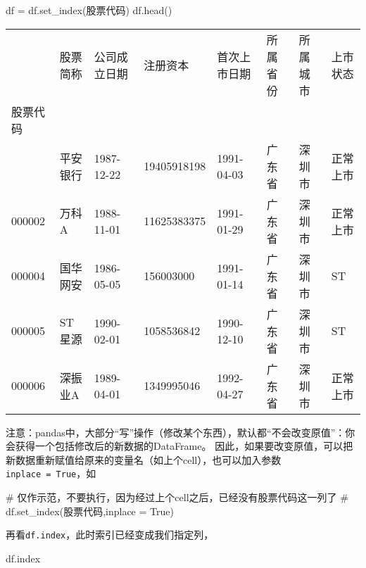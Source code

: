 \documentclass[
  letterpaper,
  DIV=11,
  numbers=noendperiod]{scrreprt}
\newenvironment{Shaded}{\begin{snugshade}}{\end{snugshade}}
\newcommand{\CommentTok}[1]{\textcolor[rgb]{0.37,0.37,0.37}{#1}}
\newcommand{\NormalTok}[1]{\textcolor[rgb]{0.00,0.23,0.31}{#1}}
\newcommand{\OperatorTok}[1]{\textcolor[rgb]{0.37,0.37,0.37}{#1}}
\newcommand{\StringTok}[1]{\textcolor[rgb]{0.13,0.47,0.30}{#1}}
\begin{document}
\begin{Shaded}
\begin{Highlighting}[]
\NormalTok{df }\OperatorTok{=}\NormalTok{ df.set\_index(}\StringTok{\textquotesingle{}股票代码\textquotesingle{}}\NormalTok{) }
\NormalTok{df.head()}
\end{Highlighting}
\end{Shaded}

\begin{longtable}[]{@{}llllllll@{}}
\toprule\noalign{}
& 股票简称 & 公司成立日期 & 注册资本 & 首次上市日期 & 所属省份 &
所属城市 & 上市状态 \\
股票代码 & & & & & & & \\
\midrule\noalign{}
\endhead
\bottomrule\noalign{}
\endlastfoot
000001 & 平安银行 & 1987-12-22 & 19405918198 & 1991-04-03 & 广东省 &
深圳市 & 正常上市 \\
000002 & 万科A & 1988-11-01 & 11625383375 & 1991-01-29 & 广东省 & 深圳市
& 正常上市 \\
000004 & 国华网安 & 1986-05-05 & 156003000 & 1991-01-14 & 广东省 &
深圳市 & ST \\
000005 & ST 星源 & 1990-02-01 & 1058536842 & 1990-12-10 & 广东省 &
深圳市 & ST \\
000006 & 深振业A & 1989-04-01 & 1349995046 & 1992-04-27 & 广东省 &
深圳市 & 正常上市 \\
\end{longtable}

注意：pandas中，大部分``写''操作（修改某个东西），默认都``不会改变原值''：你会获得一个包括修改后的新数据的DataFrame。
因此，如果要改变原值，可以把新数据重新赋值给原来的变量名（如上个cell），也可以加入参数\texttt{inplace\ =\ True}，如

\begin{Shaded}
\begin{Highlighting}[]
\CommentTok{\# 仅作示范，不要执行，因为经过上个cell之后，已经没有\textasciigrave{}股票代码\textasciigrave{}这一列了}
\CommentTok{\# df.set\_index(\textquotesingle{}股票代码\textquotesingle{},inplace = True)}
\end{Highlighting}
\end{Shaded}

再看\texttt{df.index}，此时索引已经变成我们指定列，

\begin{Shaded}
\begin{Highlighting}[]
\NormalTok{df.index}
\end{Highlighting}
\end{Shaded}
\end{document}
